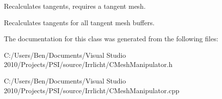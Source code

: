 Recalculates tangents, requires a tangent mesh. 

Recalculates tangents for all tangent mesh buffers. 

The documentation for this class was generated from the following files\-:\begin{DoxyCompactItemize}
\item 
C\-:/\-Users/\-Ben/\-Documents/\-Visual Studio 2010/\-Projects/\-P\-S\-I/source/\-Irrlicht/C\-Mesh\-Manipulator.\-h\item 
C\-:/\-Users/\-Ben/\-Documents/\-Visual Studio 2010/\-Projects/\-P\-S\-I/source/\-Irrlicht/C\-Mesh\-Manipulator.\-cpp\end{DoxyCompactItemize}
